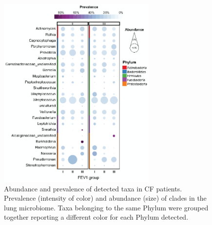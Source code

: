 \begin{figure}[!tb]
	\centering
	\includegraphics[width=0.7\textwidth]{./figures/Chapter_7/Figure_2_16s}
  	\caption{\label{fig:fig216s} Abundance and prevalence of detected taxa in CF patients. Prevalence (intensity of color) and abundance (size) of clades in the lung microbiome. Taxa belonging to the same Phylum were grouped together reporting a different color for each Phylum detected.}
\end{figure}%

